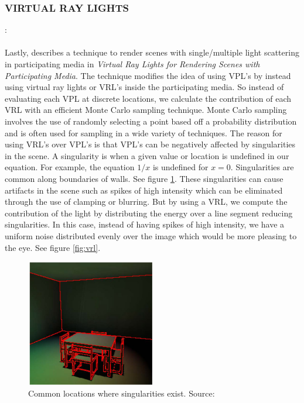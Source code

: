 \subsubsection{VIRTUAL RAY LIGHTS}: 
\paragraph{}
Lastly, \cite{Novak2012} describes a technique to render scenes with single/multiple light scattering in participating media in \textit{Virtual Ray Lights for Rendering Scenes with Participating Media}.  The technique modifies the idea of using VPL's by instead using virtual ray lights or VRL's inside the participating media.  So instead of evaluating each VPL at discrete locations, we calculate the contribution of each VRL with an efficient Monte Carlo sampling technique.  Monte Carlo sampling involves the use of randomly selecting a point based off a probability distribution and is often used for sampling in a wide variety of techniques.  The reason for using VRL's over VPL's is that VPL's can be negatively affected by singularities in the scene.  A singularity is when a given value or location is undefined in our equation.  For example, the equation $1/x$ is undefined for $x=0$.  Singularities are common along boundaries of walls.  See figure \ref{fig:singularity}.  These singularities can cause artifacts in the scene such as spikes of high intensity which can be eliminated through the use of clamping or blurring.  But by using a VRL, we compute the contribution of the light by distributing the energy over a line segment reducing singularities.  In this case, instead of having spikes of high intensity, we have a uniform noise distributed evenly over the image which would be more pleasing to the eye.  See figure \ref{fig:vrl}.

\begin{figure}[h!]
  \centering
    \includegraphics[width=0.5\textwidth]{singularity.jpg}
  \caption{Common locations where singularities exist. Source: \protect\cite{Dachsbacher2005}}
	\label{fig:singularity}
\end{figure}

